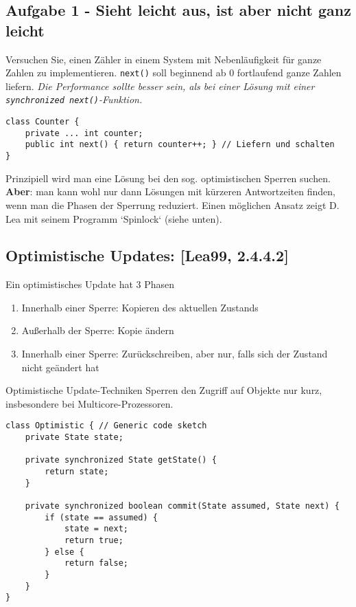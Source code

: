 \subsection{Aufgabe 1 - Sieht leicht aus, ist aber nicht ganz
leicht}\label{aufgabe-1---sieht-leicht-aus-ist-aber-nicht-ganz-leicht}

Versuchen Sie, einen Zähler in einem System mit Nebenläufigkeit für
ganze Zahlen zu implementieren. \texttt{next()} soll beginnend ab 0
fortlaufend ganze Zahlen liefern. \emph{Die Performance sollte besser
sein, als bei einer Lösung mit einer
\texttt{synchronized\ next()}-Funktion.}

\begin{verbatim}
class Counter {
    private ... int counter;
    public int next() { return counter++; } // Liefern und schalten
}
\end{verbatim}

\begin{important}
Prinzipiell wird man eine Lösung bei den sog. optimistischen Sperren suchen.
\textbf{Aber}: man kann wohl nur dann Lösungen mit kürzeren Antwortzeiten
finden, wenn man die Phasen der Sperrung reduziert. Einen möglichen Ansatz
zeigt D. Lea mit seinem Programm `Spinlock` (siehe unten).
\end{important}

\subsection{Optimistische Updates: {[}Lea99,
2.4.4.2{]}}\label{optimistische-updates-lea99-2.4.4.2}

Ein optimistisches Update hat 3 Phasen

\begin{enumerate}
\def\labelenumi{\arabic{enumi}.}
\tightlist
\item
  Innerhalb einer Sperre: Kopieren des aktuellen Zustands
\item
  Außerhalb der Sperre: Kopie ändern
\item
  Innerhalb einer Sperre: Zurückschreiben, aber nur, falls sich der
  Zustand nicht geändert hat
\end{enumerate}

Optimistische Update-Techniken Sperren den Zugriff auf Objekte nur kurz,
insbesondere bei Multicore-Prozessoren.

\begin{verbatim}
class Optimistic { // Generic code sketch
    private State state;

    private synchronized State getState() {
        return state;
    }

    private synchronized boolean commit(State assumed, State next) {
        if (state == assumed) {
            state = next;
            return true;
        } else {
            return false;
        }
    }
}
\end{verbatim}

